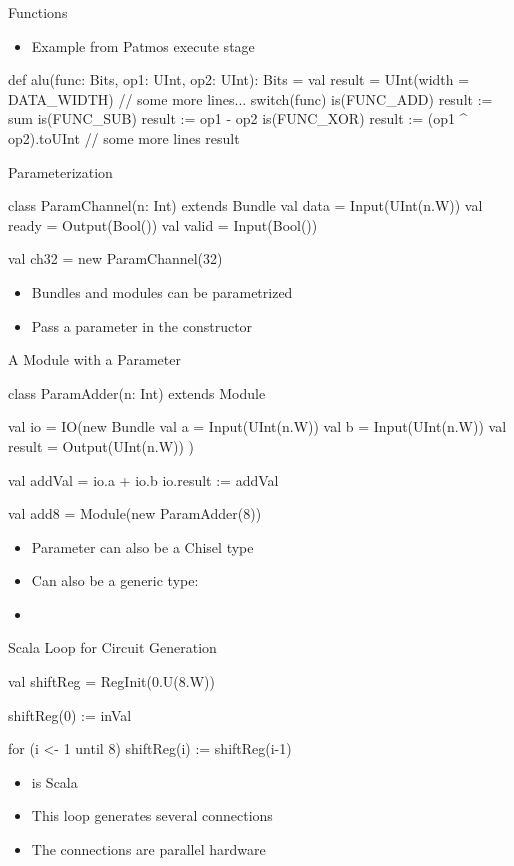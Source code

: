 \begin{frame}[fragile]{Functions}
\begin{itemize}
\item Example from Patmos execute stage
\end{itemize}
\begin{chisel}
def alu(func: Bits, op1: UInt, op2: UInt): Bits = {
  val result = UInt(width = DATA_WIDTH)
  // some more lines...
  switch(func) {
    is(FUNC_ADD) { result := sum }
    is(FUNC_SUB) { result := op1 - op2 }
    is(FUNC_XOR) { result := (op1 ^ op2).toUInt }
    // some more lines
  }
  result
}
\end{chisel}
\end{frame}


\begin{frame}[fragile]{Parameterization}
\begin{chisel}
class ParamChannel(n: Int) extends Bundle {
  val data = Input(UInt(n.W))
  val ready = Output(Bool())
  val valid = Input(Bool())
}

val ch32 = new ParamChannel(32)
\end{chisel}
\begin{itemize}
\item Bundles and modules can be parametrized
\item Pass a parameter in the constructor
\end{itemize}

\end{frame}
\begin{frame}[fragile]{A Module with a Parameter}
\begin{chisel}
class ParamAdder(n: Int) extends Module {
  val io = IO(new Bundle {
    val a = Input(UInt(n.W))
    val b = Input(UInt(n.W))
    val result = Output(UInt(n.W))
  })

  val addVal = io.a + io.b
  io.result := addVal
}

val add8 = Module(new ParamAdder(8))
\end{chisel}
\begin{itemize}
\item Parameter can also be a Chisel type
\item Can also be a generic type:
\item {}
\end{itemize}
\end{frame}

\begin{frame}[fragile]{Scala  Loop for Circuit Generation}
\begin{chisel}
val shiftReg = RegInit(0.U(8.W))

shiftReg(0) := inVal

for (i <- 1 until 8) {
  shiftReg(i) := shiftReg(i-1)
}
\end{chisel}
\begin{itemize}
\item {} is Scala
\item This loop generates several connections
\item The connections are parallel hardware
\end{itemize}
\end{frame}

